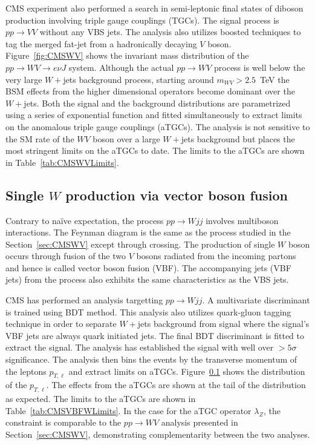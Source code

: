 \documentclass[10pt]{article}
\begin{document}
CMS experiment also performed a search in semi-leptonic final states of diboson production involving triple gauge couplings (TGCs).
The signal process is $pp\to VV$ without any VBS jets.
The analysis also utilizes boosted techniques to tag the merged fat-jet from a hadronically decaying $V$ boson.
Figure~\ref{fig:CMSWV} shows the invariant mass distribution of the $pp\to WV\to e\nu J$ system.
Although the actual $pp\to WV$ process is well below the very large $W+$jets background process, starting around $m_{WV} > 2.5$~TeV the BSM effects from the higher dimensional operators become dominant over the $W+$jets.
Both the signal and the background distributions are parametrized using a series of exponential function and fitted simultaneously to extract limits on the anomalous triple gauge couplings (aTGCs).
The analysis is not sensitive to the SM rate of the $WV$ boson over a large $W+$jets background but places the most stringent limits on the aTGCs to date.
The limits to the aTGCs are shown in Table~\ref{tab:CMSWVLimits}.

\subsection{Single $W$ production via vector boson fusion}

Contrary to na\"ive expectation, the process $pp \to W jj$ involves multiboson interactions.
The Feynman diagram is the same as the process studied in the Section~\ref{sec:CMSWV} except through crossing.
The production of single $W$ boson occurs through fusion of the two $V$ bosons radiated from the incoming partons and hence is called vector boson fusion (VBF).
The accompanying jets (VBF jets) from the process also exhibits the same characteristics as the VBS jets.

CMS has performed an analysis targetting $pp \to W jj$.
A multivariate discriminant is trained using BDT method.
This analysis also utilizes quark-gluon tagging technique in order to separate $W+$jets background from signal where the signal's VBF jets are always quark initiated jets.
The final BDT discriminant is fitted to extract the signal.
The analysis has established the signal with well over $>5\sigma$ significance.
The analysis then bins the events by the transverse momentum of the leptons $p_{T,\ell}$ and extract limits on aTGCs.
Figure~\ref{} shows the distribution of the $p_{T,\ell}$.
The effects from the aTGCs are shown at the tail of the distribution as expected.
The limits to the aTGCs are shown in Table~\ref{tab:CMSVBFWLimits}.
In the case for the aTGC operator $\lambda_Z$, the constraint is comparable to the $pp \to WV$ analysis presented in Section~\ref{sec:CMSWV}, demonstrating complementarity between the two analyses.
\end{document}
